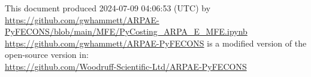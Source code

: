 {\footnotesize
\noindent
This document produced 2024-07-09 04:06:53 (UTC) by\\
\url{https://github.com/gwhammett/ARPAE-PyFECONS/blob/main/MFE/PyCosting_ARPA_E_MFE.ipynb}\\
\url{https://github.com/gwhammett/ARPAE-PyFECONS}
is a modified version of the open-source version in:\\
\url{https://github.com/Woodruff-Scientific-Ltd/ARPAE-PyFECONS}
} %
